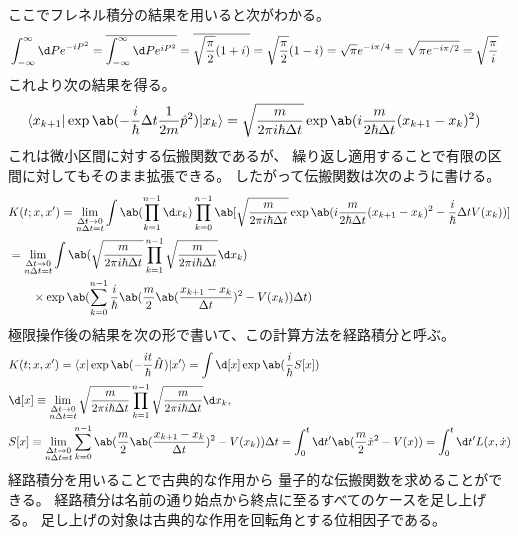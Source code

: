 ここでフレネル積分の結果を用いると次がわかる。
\begin{equation}
  \begin{split}
    &\int_{-\infty}^\infty\d Pe^{-iP^2}
    =\overline{\int_{-\infty}^\infty\d P e^{iP^2}}
    =\overline{\sqrt{\frac{\pi}{2}}(1+i)}
    =\sqrt{\frac{\pi}{2}}(1-i)
    =\sqrt{\pi}e^{-i\pi/4}
    =\sqrt{\pi e^{-i\pi/2}}
    =\sqrt{\frac{\pi}{i}}
  \end{split}
\end{equation}
これより次の結果を得る。
\begin{equation}
  \label{eq:free_propagator}
  \begin{split}
    &\braket{x_{k+1}|
      \exp\ab(-\frac{i}{\hbar}\Delta t
      \frac{1}{2m}\hat{p}^2)
      |x_k}
    =\sqrt{\frac{m}{2\pi i\hbar\Delta t}}
    \exp\ab(i\frac{m}{2\hbar\Delta t}(x_{k+1}-x_k)^2)
  \end{split}
\end{equation}
これは微小区間に対する伝搬関数であるが、
繰り返し適用することで有限の区間に対してもそのまま拡張できる。
したがって伝搬関数は次のように書ける。
\begin{equation}
  \begin{split}
    &K(t;x,x')
    =\lim_{\substack{\Delta t\to0\\n\Delta t=t}}
    \int\ab(\prod_{k=1}^{n-1}\d x_k)
    \prod_{k=0}^{n-1}
    \ab[
      \sqrt{\frac{m}{2\pi i\hbar\Delta t}}
      \exp\ab(i\frac{m}{2\hbar\Delta t}(x_{k+1}-x_k)^2
      -\frac{i}{\hbar}\Delta tV(x_k))
    ] \\
    &=\lim_{\substack{\Delta t\to0\\n\Delta t=t}}
    \int\ab(
    \sqrt{\frac{m}{2\pi i\hbar\Delta t}}
    \prod_{k=1}^{n-1}\sqrt{\frac{m}{2\pi i\hbar\Delta t}}\d x_k) \\
    &\qquad\times\exp\ab(
    \sum_{k=0}^{n-1}
    \frac{i}{\hbar}\ab(
    \frac{m}{2}\ab(\frac{x_{k+1}-x_k}{\Delta t})^2-V(x_k)
    )\Delta t
    )
  \end{split}
\end{equation}
極限操作後の結果を次の形で書いて、この計算方法を経路積分と呼ぶ。
\begin{equation}
  \begin{split}
    &K(t;x,x')=\braket{x|\exp\ab(-\frac{it}{\hbar}\hat{H})|x'}
    =\int\d[x]\exp\ab(\frac{i}{\hbar}S[x]) \\
    &\d[x]\equiv
    \lim_{\substack{\Delta t\to0\\n\Delta t=t}}
    \sqrt{\frac{m}{2\pi i\hbar\Delta t}}
    \prod_{k=1}^{n-1}\sqrt{\frac{m}{2\pi i\hbar\Delta t}}\d x_k, \\
    &S[x]\equiv
    \lim_{\substack{\Delta t\to0\\n\Delta t=t}}
    \sum_{k=0}^{n-1}
    \ab(
    \frac{m}{2}\ab(\frac{x_{k+1}-x_k}{\Delta t})^2-V(x_k)
    )\Delta t
    =\int_0^t\d t'\ab(\frac{m}{2}\dot{x}^2-V(x))
    =\int_0^t\d t'L(x,\dot{x})
  \end{split}
\end{equation}
経路積分を用いることで古典的な作用から
量子的な伝搬関数を求めることができる。
経路積分は名前の通り始点から終点に至るすべてのケースを足し上げる。
足し上げの対象は古典的な作用を回転角とする位相因子である。

